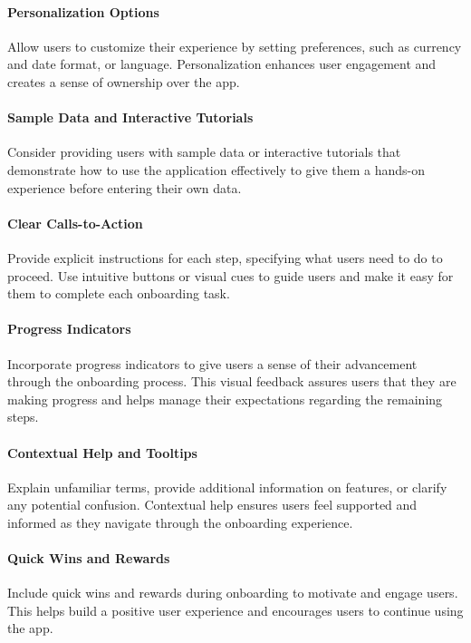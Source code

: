 \paragraph{Personalization Options}
Allow users to customize their experience by setting preferences, such as currency and date format, or language. 
Personalization enhances user engagement and creates a sense of ownership over the app.

\paragraph{Sample Data and Interactive Tutorials}
Consider providing users with sample data or interactive tutorials that demonstrate how to use the application 
effectively to give them a hands-on experience before entering their own data.

\paragraph{Clear Calls-to-Action}
Provide explicit instructions for each step, specifying what users need to do to proceed. Use intuitive buttons or 
visual cues to guide users and make it easy for them to complete each onboarding task.

\paragraph{Progress Indicators}
Incorporate progress indicators to give users a sense of their advancement through the onboarding process. 
This visual feedback assures users that they are making progress and helps manage their expectations regarding 
the remaining steps.

\paragraph{Contextual Help and Tooltips}
Explain unfamiliar terms, provide additional information on features, or clarify any potential confusion. Contextual 
help ensures users feel supported and informed as they navigate through the onboarding experience.

\paragraph{Quick Wins and Rewards}
Include quick wins and rewards during onboarding to motivate and engage users. This helps build a positive user 
experience and encourages users to continue using the app.

